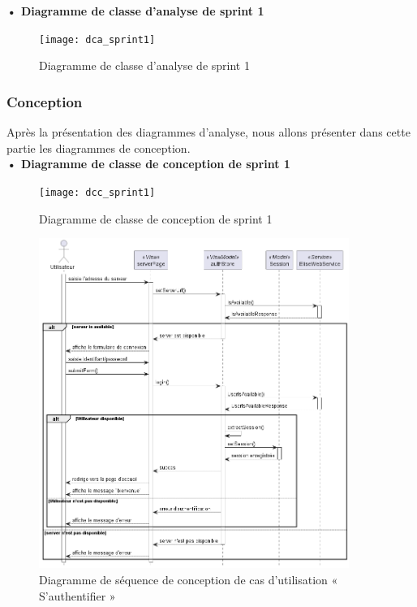\setlength{\parskip}{1em}
\setlength{\parindent}{0em}

\textbf{•	Diagramme de classe d'analyse de sprint 1 }


\begin{figure}[H]
  \centering
  \texttt{[image: dca\_sprint1]}
  \caption{Diagramme de classe d'analyse de sprint 1}
  \label{fig:class_analyse_auth}
\end{figure}


\subsubsection{Conception}

Après la présentation des diagrammes d'analyse, nous allons présenter dans cette partie les diagrammes de conception.\\ 
\textbf{•	Diagramme de classe de conception de sprint 1}

\begin{figure}[H]
  \centering
  \texttt{[image: dcc\_sprint1]}
  \caption{Diagramme de classe de conception de sprint 1}
  \label{fig:class_diagram_auth}
\end{figure}


\begin{figure}[H]
  \centering
  \includegraphics[width=0.9\textwidth]{out/diagrams/authentification/sequence_simple_login/sequence_simple_login}
  \caption{Diagramme de séquence de conception de cas d'utilisation « S'authentifier »}
  \label{fig:sequence_conception_login}
\end{figure}

